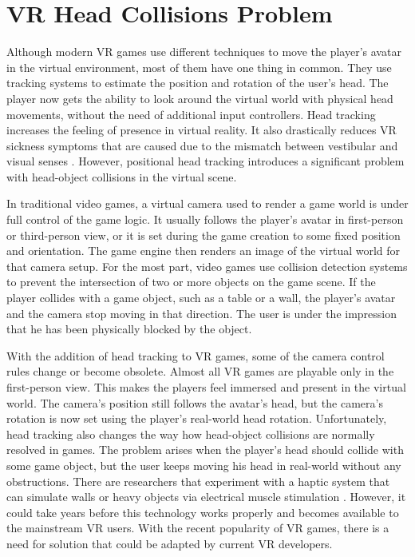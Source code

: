 \section{VR Head Collisions Problem}

Although modern VR games use different techniques to move the player's avatar in the virtual environment, most of them have one thing in common. They use tracking systems to estimate the position and rotation of the user's head. The player now gets the ability to look around the virtual world with physical head movements, without the need of additional input controllers. Head tracking increases the feeling of presence in virtual reality. It also drastically reduces VR sickness symptoms that are caused due to the mismatch between vestibular and visual senses \cite{HEADTRACKINGSYMPTOMS}. However, positional head tracking introduces a significant problem with head-object collisions in the virtual scene.

In traditional video games, a virtual camera used to render a game world is under full control of the game logic. It usually follows the player's avatar in first-person or third-person view, or it is set during the game creation to some fixed position and orientation. The game engine then renders an image of the virtual world for that camera setup. For the most part, video games use collision detection systems to prevent the intersection of two or more objects on the game scene. If the player collides with a game object, such as a table or a wall, the player's avatar and the camera stop moving in that direction. The user is under the impression that he has been physically blocked by the object. 

With the addition of head tracking to VR games, some of the camera control rules change or become obsolete. Almost all VR games are playable only in the first-person view. This makes the players feel immersed and present in the virtual world. The camera's position still follows the avatar's head, but the camera's rotation is now set using the player’s real-world head rotation. Unfortunately, head tracking also changes the way how head-object collisions are normally resolved in games. The problem arises when the player's head should collide with some game object, but the user keeps moving his head in real-world without any obstructions. There are researchers that experiment with a haptic system that can simulate walls or heavy objects via electrical muscle stimulation \cite{HEPTICSYSTEM}. However, it could take years before this technology works properly and becomes available to the mainstream VR users. With the recent popularity of VR games, there is a need for solution that could be adapted by current VR developers.

